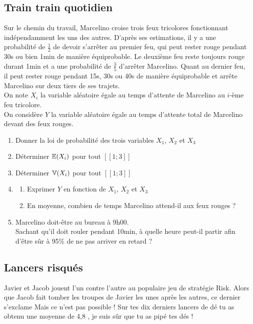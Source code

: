 \documentclass[oneside,12pt]{book}          %
\begin{document}
\subsection{Train train quotidien}
Sur le chemin du travail, Marcelino croise trois feux tricolores fonctionnant indépendamment les uns des autres. D'après ses estimations, il y a une probabilité de $\frac{1}{2}$ de devoir s'arrêter au premier feu, qui peut rester rouge pendant 30s ou bien 1min de manière équiprobable. Le deuxième feu reste toujours rouge durant 1min et a une probabilité de $\frac{3}{5}$ d'arrêter Marcelino. Quant au dernier feu, il peut rester rouge pendant 15s, 30s ou 40s de manière équiprobable et arrête Marcelino sur deux tiers de ses trajets.\\[5pt]
On note $X_i$ la variable aléatoire égale au temps d'attente de Marcelino au $i$-ème feu tricolore.\\
On considère $Y$ la variable aléatoire égale au temps d'attente total de Marcelino devant des feux rouges.
\begin{enumerate}
	\item Donner la loi de probabilité des trois variables $X_1$, $X_2$ et $X_3$
    \item Déterminer ${\mathbb E}(X_i)$ pour tout $[\![1;3]\!]$
    \item Déterminer ${\mathbb V}(X_i)$ pour tout $[\![1;3]\!]$
    \item \begin{enumerate}
    	\item Exprimer $Y$ en fonction de $X_1$, $X_2$ et $X_3$
    	\item En moyenne, combien de temps Marcelino attend-il aux feux rouges ?
    \end{enumerate}
    \item Marcelino doit-être au bureau à 9h00.\\
    Sachant qu'il doit rouler pendant 10min, à quelle heure peut-il partir afin d'être sûr à 95\% de ne pas arriver en retard ?
\end{enumerate}



\subsection{Lancers risqués}
Javier et Jacob jouent l'un contre l'autre au populaire jeu de stratégie Risk. Alors que Jacob fait tomber les troupes de Javier les unes après les autres, ce dernier s'exclame \og Mais ce n'est pas possible ! Sur tes dix derniers lancers de dé tu as obtenu une moyenne de 4,8 , je suis sûr que tu as pipé tes dés ! \fg
\end{document}
